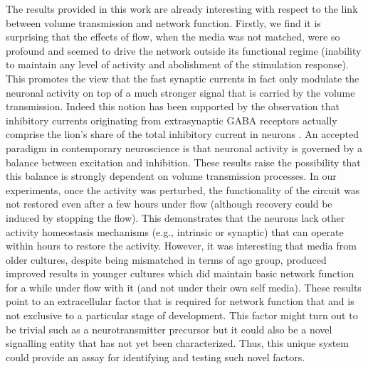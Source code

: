 The results provided in this work are already interesting with respect to the link between volume transmission and network function. Firstly, we find it is surprising that the effects of flow, when the media was not matched, were so profound and seemed to drive the network outside its functional regime (inability to maintain any level of activity and abolishment of the stimulation response). This promotes the view that the fast synaptic currents in fact only modulate the neuronal activity on top of a much stronger signal that is carried by the volume transmission. Indeed this notion has been supported by the observation that inhibitory currents originating from extrasynaptic GABA receptors actually comprise the lion's share of the total inhibitory current in neurons \cite{farrant2005variations,mody2004diversity}. An accepted paradigm in contemporary neuroscience is that neuronal activity is governed by a balance between excitation and inhibition. These results raise the possibility that this balance is strongly dependent on volume transmission processes. In our experiments, once the activity was perturbed, the functionality of the circuit was not restored even after a few hours under flow (although recovery could be induced by stopping the flow). This demonstrates that the neurons lack other activity homeostasis mechanisms (e.g., intrinsic or synaptic) that can operate within hours to restore the activity. However, it was interesting that media from older cultures, despite being mismatched in terms of age group, produced improved results in younger cultures which did maintain basic network function for a while under flow with it (and not under their own self media). These results point to an extracellular factor that is required for network function that and is not exclusive to a particular stage of development. This factor might turn out to be trivial such as a neurotransmitter precursor but it could also be a novel signalling entity that has not yet been characterized. Thus, this unique system could provide an assay for identifying and testing such novel factors.

